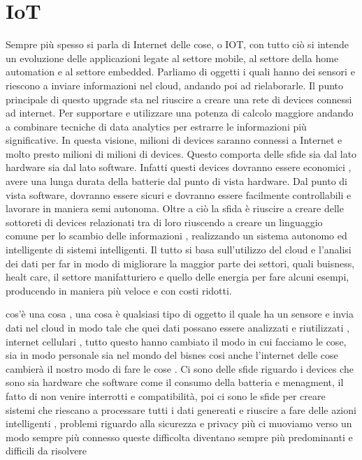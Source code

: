 \section{IoT}
Sempre più spesso si parla di Internet delle cose, o IOT, con tutto ciò si
intende un evoluzione delle applicazioni legate al settore mobile, al settore
della home automation e al settore embedded. Parliamo di oggetti i quali hanno
dei sensori e riescono a inviare informazioni nel cloud, andando poi ad
rielaborarle. 
Il punto principale di questo
upgrade sta nel riuscire a creare una rete di devices connessi ad internet. Per
supportare e utilizzare una potenza di calcolo maggiore andando a combinare
tecniche di data analytics per estrarre le informazioni più significative. 
In
questa visione, milioni di devices saranno connessi a Internet e molto presto
milioni di milioni di devices. 
Questo comporta delle sfide sia dal lato hardware sia dal lato software. Infatti
questi devices dovranno essere economici , avere una lunga durata della batterie
dal punto di vista hardware. Dal punto di vista software, dovranno essere sicuri
e dovranno essere facilmente controllabili e lavorare in maniera semi autonoma.
Oltre a ciò la  sfida è riuscire a creare delle sottoreti di devices relazionati tra di loro
riuscendo a creare un linguaggio comune per lo scambio delle informazioni ,
realizzando un sistema autonomo ed intelligente di sistemi intelligenti. Il
tutto si basa sull'utilizzo del cloud e l'analisi dei dati per far in modo di
migliorare la maggior parte dei settori, quali buisness, healt care, il
settore manifatturiero e quello delle energia per fare alcuni esempi, producendo
in maniera più veloce e con costi ridotti. 

cos'è una cosa , una cosa è qualsiasi tipo di oggetto il quale ha un sensore e
invia dati nel cloud in modo tale che quei dati possano essere analizzati e
riutilizzati , internet cellulari , tutto questo hanno cambiato il modo in cui
facciamo le cose, sia in modo personale sia nel mondo del bisnes  cosi anche
l'internet delle cose cambierà il nostro modo di fare le cose . Ci sono delle
sfide riguardo i devices che sono sia hardware che software come il consumo
della batteria e menagment, il fatto di non venire interrotti e compatibilità,
poi ci sono le sfide per creare sistemi che riescano a processare tutti i dati
genereati e riuscire a fare delle azioni intelligenti , problemi riguardo alla
sicurezza e privacy più ci muoviamo verso un modo sempre più connesso queste
difficolta diventano sempre più predominanti e difficili da risolvere

